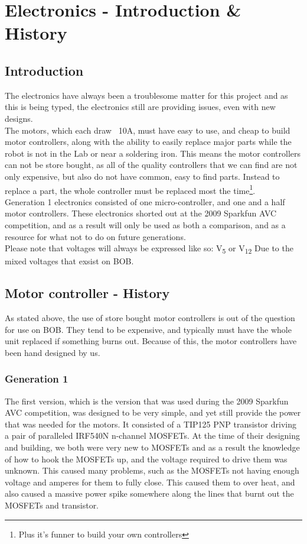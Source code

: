 \documentclass{article}
\begin{document}
\section{Electronics - Introduction \& History}
\subsection{Introduction}
The electronics have always been a troublesome matter for this project and as this is being typed, the electronics still are providing issues, even with new designs.\\
The motors, which each draw ~10A, must have easy to use, and cheap to build motor controllers, along with the ability to easily replace major parts while the robot is not in the Lab or near a soldering iron. This means the motor controllers can not be store bought, as all of the quality controllers that we can find are not only expensive, but also do not have common, easy to find parts. Instead to replace a part, the whole controller must be replaced most the time\footnote{Plus it's funner to build your own controllers}.\\
Generation 1 electronics consisted of one micro-controller, and one and a half motor controllers. These electronics shorted out at the 2009 Sparkfun AVC competition, and as a result will only be used as both a comparison, and as a resource for what not to do on future generations.\\
Please note that voltages will always be expressed like so: V\textsubscript{5} or V\textsubscript{12} Due to the mixed voltages that exsist on BOB.
\subsection{Motor controller - History}
As stated above, the use of store bought motor controllers is out of the question for use on BOB. They tend to be expensive, and typically must have the whole unit replaced if something burns out. Because of this, the motor controllers have been hand designed by us.\\
\subsubsection{Generation 1}
The first version, which is the version that was used during the 2009 Sparkfun AVC competition, was designed to be very simple, and yet still provide the power that was needed for the motors. It consisted of a TIP125 PNP transistor driving a pair of paralleled IRF540N n-channel MOSFETs. At the time of their designing and building, we both were very new to MOSFETs and as a result the knowledge of how to hook the MOSFETs up, and the voltage required to drive them was unknown. This caused many problems, such as the MOSFETs not having enough voltage and amperes for them to fully close. This caused them to over heat, and also caused a massive power spike somewhere along the lines that burnt out the MOSFETs and transistor.\\
\end{document}
